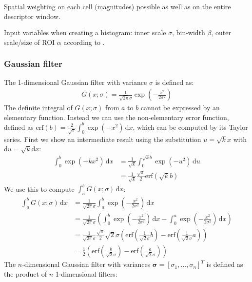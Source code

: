\documentclass[thesis.tex]{subfiles}
\begin{document}
Spatial weighting on each cell (magnitudes) possible as well as on the entire descriptor window.

Input variables when creating a histogram: inner scale $\sigma$, bin-width $\beta$, outer scale/size of ROI $\alpha$ according to \citet{koenderink1999structure}.



\subsubsection{Gaussian filter}

The 1-dimensional Gaussian filter with variance $\sigma$ is defined as:
%
\begin{align}
G(x;\sigma) = \frac{1}{\sqrt{2\pi} \sigma}
\exp\left( -\frac{x^2}{2 \sigma^2} \right)
\end{align}
%
The definite integral of $G(x;\sigma)$ from $a$ to $b$ cannot be expressed by an elementary function. Instead we can use the non-elementary error function, defined as $\mathrm{erf}(b) = \frac{2}{\sqrt{\pi}} \int_0^b \exp(-x^2) \,\mathrm dx$, which can be computed by its Taylor series. First we show an intermediate result using the substitution $u = \sqrt{k} x$ with $\mathrm du = \sqrt{k} \mathrm dx$:
%
\begin{align}
\int_0^b \exp(-k x^2) \,\mathrm dx
&= \frac{1}{\sqrt{k}} \int_0^{\sqrt{k}b} \exp(-u^2) \,\mathrm du \\
&= \frac{1}{\sqrt{k}} \frac{\sqrt{\pi}}{2} \mathrm{erf} \left( \sqrt{k} b \right)
\end{align}
%
We use this to compute $\int_a^b G(x;\sigma) \,\mathrm dx$:
%
\begin{align}
\int_a^b G(x;\sigma) \,\mathrm dx
&= \frac{1}{\sqrt{2\pi} \sigma} \int_a^b \exp\left( -\frac{x^2}{2 \sigma^2} \right) \,\mathrm dx \\
&= \frac{1}{\sqrt{2\pi} \sigma} \left( \int_0^b \exp\left( -\frac{x^2}{2 \sigma^2} \right) \,\mathrm dx - \int_0^a \exp\left( -\frac{x^2}{2 \sigma^2} \right) \,\mathrm dx \right) \\
&= \frac{1}{\sqrt{2\pi} \sigma} \frac{\sqrt{\pi}}{2} \sqrt{2} \sigma \left(
\mathrm{erf} \left( \frac{1}{\sqrt{2} \sigma} b \right) -
\mathrm{erf} \left( \frac{1}{\sqrt{2} \sigma} a \right) \right) \\
&= \frac{1}{2} \left(
\mathrm{erf} \left( \frac{b}{\sqrt{2} \sigma} \right) -
\mathrm{erf} \left( \frac{a}{\sqrt{2} \sigma} \right)
\right)
\end{align}
%
The $n$-dimensional Gaussian filter with variances $\boldsymbol{\sigma} = [\sigma_1, ..., \sigma_n]^T$ is defined as the product of $n$ 1-dimensional filters:
\end{document}
